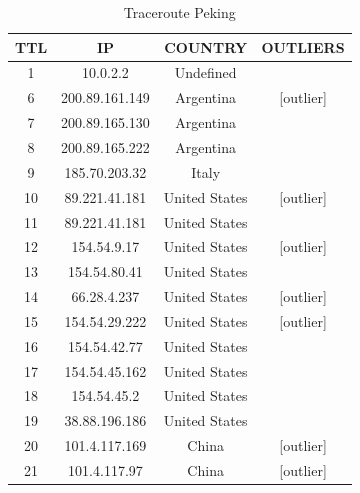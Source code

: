 \begin{table}[!htbp]
\centering
\caption{Traceroute Peking}
\label{traceroute-peking}
\begin{tabular}{|c|c|c|c|}
\hline
\textbf{TTL} & \textbf{IP}   			     & \textbf{COUNTRY} & \textbf{OUTLIERS} \\ \hline
1            & 10.0.2.2                       & Undefined        &                   \\ \hline
6            & 200.89.161.149                 & Argentina        & {[}outlier{]}     \\ \hline
7            & 200.89.165.130                 & Argentina        &                   \\ \hline
8            & 200.89.165.222                 & Argentina        &                   \\ \hline
9            & 185.70.203.32                  & Italy            &                   \\ \hline
10           & 89.221.41.181                  & United States    & {[}outlier{]}     \\ \hline
11           & 89.221.41.181                  & United States    &                   \\ \hline
12           & 154.54.9.17                    & United States    & {[}outlier{]}     \\ \hline
13           & 154.54.80.41                   & United States    &                   \\ \hline
14           & 66.28.4.237                    & United States    & {[}outlier{]}     \\ \hline
15           & 154.54.29.222                  & United States    & {[}outlier{]}     \\ \hline
16           & 154.54.42.77                   & United States    &                   \\ \hline
17           & 154.54.45.162                  & United States    &                   \\ \hline
18           & 154.54.45.2                    & United States    &                   \\ \hline
19           & 38.88.196.186                  & United States    &                   \\ \hline
20           & 101.4.117.169                  & China            & {[}outlier{]}     \\ \hline
21           & 101.4.117.97                   & China            & {[}outlier{]}     \\ \hline

\end{tabular}
\end{table}
